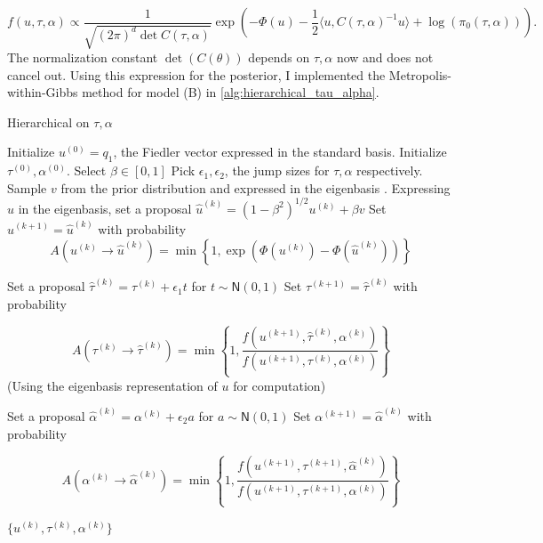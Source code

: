 \documentclass{siamart1116}
\begin{document}
        \begin{equation}
        \label{eqn:centered_post}
        f(u,\tau,\alpha) \propto 
        \frac{1}{\sqrt{(2\pi)^d \det C(\tau,\alpha)}} \exp\left(-\Phi(u)-\frac{1}{2}\langle u, C(\tau,\alpha)^{-1}u  \rangle + \log(\pi_0(\tau,\alpha)) \right).
        \end{equation}
        The normalization constant $\det(C(\theta))$ depends on $\tau, \alpha$ now and does not cancel out. Using this expression for the posterior, I implemented the Metropolis-within-Gibbs method for model (B) in \cref{alg:hierarchical_tau_alpha}.

        \begin{algorithm}
        \caption{Hierarchical on $\tau, \alpha$}
        \label{alg:hierarchical_tau_alpha}
        \begin{algorithmic}
        \State Initialize $u^{(0)} = q_1$, the Fiedler vector expressed in the standard basis.
        \State Initialize $\tau^{(0)}, \alpha^{(0)}$. Select $\beta \in [0, 1]$
        \State Pick $\epsilon_1, \epsilon_2$, the jump sizes for $\tau, \alpha$ respectively.
        \State Sample $v$ from the prior distribution and expressed in the eigenbasis .
        \State Expressing $u$ in the eigenbasis, set a proposal $\hat u^{(k)} = (1- \beta^2)^{1/2}u^{(k)} + \beta v$
        \State Set $u^{(k+1)} = \hat u^{(k)}$ with probability 
        \[A(u^{(k)} \to \hat u^{(k)}) = \min \left\{1, \exp(\Phi(u^{(k)}) - \Phi(\hat u^{(k)})) \right\}\]

        \State Set a proposal $\hat \tau^{(k)} = \tau^{(k)} + \epsilon_1 t$ for $t \sim \mathsf{N}(0, 1)$ 
        \State Set $\tau^{(k+1)} = \hat \tau^{(k)}$ with probability 

        \[A(\tau^{(k)} \to \hat \tau^{(k)}) = \min \left\{ 1, \frac{f(u^{(k+1)}, \hat \tau^{(k)}, \alpha^{(k)})}{f(u^{(k+1)}, \tau^{(k)}, \alpha^{(k)})}\right\}\]
        (Using the eigenbasis representation of $u$ for computation) 

        \State Set a proposal $\hat \alpha^{(k)} = \alpha^{(k)} + \epsilon_2 a$ for $a \sim \mathsf{N}(0, 1)$ 
        \State Set $\alpha^{(k+1)} = \hat \alpha^{(k)}$ with probability

         \[A(\alpha^{(k)}\to\hat\alpha^{(k)}) = 
         \min\left\{1, 
         \frac{f(u^{(k+1)}, \tau^{(k+1)}, \hat \alpha^{(k)})}
         {f(u^{(k+1)}, \tau^{(k+1)}, \alpha^{(k)})}\right\}
         \]

        \EndFor
        \State \Return $\{u^{(k)}, \tau^{(k)}, \alpha^{(k)}\}$
        \end{algorithmic}
        \end{algorithm}
\end{document}
